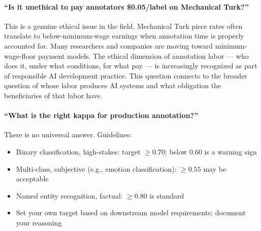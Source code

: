 \paragraph{``Is it unethical to pay annotators \$0.05/label on Mechanical Turk?''}
This is a genuine ethical issue in the field. Mechanical Turk piece rates often translate to below-minimum-wage earnings when annotation time is properly accounted for. Many researchers and companies are moving toward minimum-wage-floor payment models. The ethical dimension of annotation labor --- who does it, under what conditions, for what pay --- is increasingly recognized as part of responsible AI development practice. This question connects to the broader question of whose labor produces AI systems and what obligation the beneficiaries of that labor have.

\paragraph{``What is the right kappa for production annotation?''}
There is no universal answer. Guidelines:
\begin{itemize}
    \item Binary classification, high-stakes: target $\geq 0.70$; below 0.60 is a warning sign
    \item Multi-class, subjective (e.g., emotion classification): $\geq 0.55$ may be acceptable
    \item Named entity recognition, factual: $\geq 0.80$ is standard
    \item Set your own target based on downstream model requirements; document your reasoning
\end{itemize}
